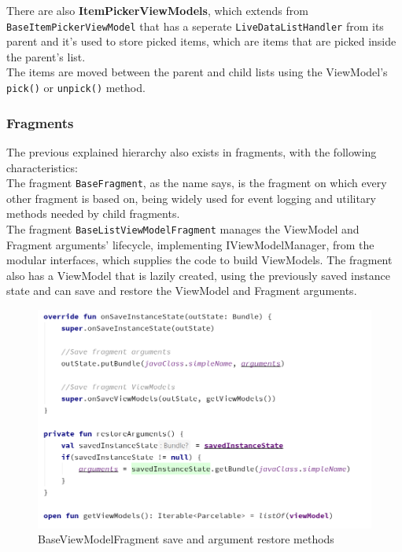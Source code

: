 There are also \textbf{ItemPickerViewModels}, which extends from \texttt{BaseItemPickerViewModel} that has a seperate \texttt{LiveDataListHandler} from its parent and
it's used to store picked items, which are items that are picked inside the parent's list.\\

The items are moved between the parent and child lists using the ViewModel's \texttt{pick()} or \texttt{unpick()} method.\\

\subsubsection{Fragments}

The previous explained hierarchy also exists in fragments, with the following characteristics:\\

The fragment \texttt{BaseFragment}, as the name says, is the fragment on which every other fragment is based on, being widely used for event 
logging and utilitary methods needed by child fragments.\\

The fragment \texttt{BaseListViewModelFragment} manages the ViewModel and Fragment arguments' lifecycle, implementing IViewModelManager,
from the modular interfaces, which supplies the code to build ViewModels. 
The fragment also has a ViewModel that is lazily created, using the previously saved instance state and can save and restore 
the ViewModel and Fragment arguments.\\

\begin{figure}[H]
    \begin{center}
        \includegraphics[scale=0.5]{_figures/BaseViewModelFragment(save and restore).png}
        \caption{BaseViewModelFragment save and argument restore methods}
    \end{center}
\end{figure}


